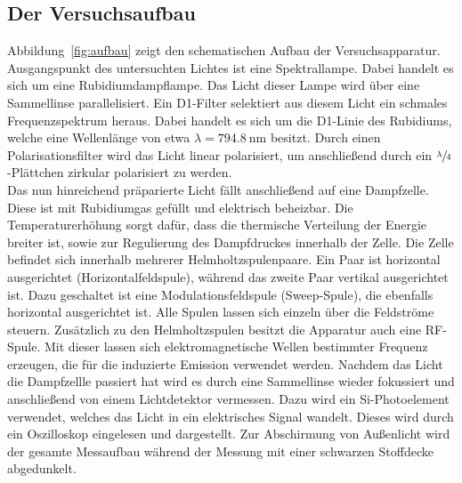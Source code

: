 \documentclass[
  bibliography=totoc,     %
  captions=tableheading,  %
  titlepage=firstiscover, %
]{scrartcl}
\begin{document}
\subsection{Der Versuchsaufbau}
Abbildung~\ref{fig:aufbau} zeigt den schematischen Aufbau der Versuchsapparatur.
Ausgangspunkt des untersuchten Lichtes ist eine Spektrallampe. Dabei handelt es
sich um eine Rubidiumdampflampe. Das Licht dieser Lampe wird über eine
Sammellinse parallelisiert. Ein D1-Filter selektiert aus diesem
Licht ein schmales Frequenzspektrum heraus. Dabei handelt es sich um die
D1-Linie des Rubidiums, welche eine Wellenlänge von etwa
$\lambda=\SI{794.8}{\nano\metre}$ besitzt. Durch einen Polarisationsfilter
wird das Licht linear polarisiert, um anschließend durch ein
$\sfrac{\lambda}{4}$-Plättchen zirkular polarisiert zu werden. \\
Das nun hinreichend präparierte Licht fällt anschließend auf eine Dampfzelle.
Diese ist mit Rubidiumgas gefüllt und elektrisch beheizbar. Die Temperaturerhöhung
sorgt dafür, dass die thermische Verteilung der Energie breiter ist, sowie zur
Regulierung des Dampfdruckes innerhalb der Zelle. Die Zelle befindet sich
innerhalb mehrerer Helmholtzspulenpaare. Ein Paar ist horizontal ausgerichtet
(Horizontalfeldspule), während das zweite Paar vertikal ausgerichtet ist. Dazu
geschaltet ist eine Modulationsfeldspule (Sweep-Spule), die ebenfalls horizontal
ausgerichtet ist. Alle Spulen lassen sich
einzeln über die Feldströme steuern. Zusätzlich zu den Helmholtzspulen besitzt
die Apparatur auch eine RF-Spule. Mit dieser lassen sich elektromagnetische Wellen
bestimmter Frequenz erzeugen, die für die induzierte Emission verwendet werden.
Nachdem das Licht die Dampfzellle passiert hat wird es durch eine Sammellinse
wieder fokussiert und anschließend von einem Lichtdetektor vermessen.
Dazu wird ein Si-Photoelement verwendet, welches das Licht in ein elektrisches
Signal wandelt. Dieses wird durch ein Oszilloskop eingelesen und dargestellt.
Zur Abschirmung von Außenlicht wird der gesamte Messaufbau während der Messung
mit einer schwarzen Stoffdecke abgedunkelt.
\end{document}
